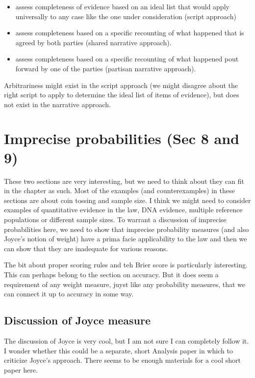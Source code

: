 \documentclass[
  10pt,
  dvipsnames,enabledeprecatedfontcommands]{scrartcl}
\begin{document}
\begin{itemize}
\item
  assess completeness of evidence based on an ideal list that would
  apply universally to any case like the one under consideration (script
  approach)
\item
  assess completeness based on a specific recounting of what happened
  that is agreed by both parties (shared narrative approach).
\item
  assess completeness based on a specific recounting of what happened
  pout forward by one of the parties (partisan narrative approach).
\end{itemize}

Arbitrariness might exist in the script approach (we might disagree
about the right script to apply to determine the ideal list of items of
evidence), but does not exist in the narrative approach.

\hypertarget{imprecise-probabilities-sec-8-and-9}{%
\section{Imprecise probabilities (Sec 8 and
9)}\label{imprecise-probabilities-sec-8-and-9}}

These two sections are very interesting, but we need to think about they
can fit in the chapter as such. Most of the examples (and
counterexamples) in these sections are about coin tossing and sample
size. I think we might need to consider examples of quantitative
evidence in the law, DNA evidence, multiple reference populations or
different sample sizes. To warrant a discussion of imprecise
probabilities here, we need to show that imprecise probability measures
(and also Joyce's notion of weight) have a prima facie applicability to
the law and then we can show that they are inadequate for various
reasons.

The bit about proper scoring rules and teh Brier score is particularly
interesting. This can perhaps belong to the section on accuracy. But it
does seem a requirement of any weight measure, juyst like any
probability measures, that we can connect it up to accuracy in some way.

\hypertarget{discussion-of-joyce-measure}{%
\subsection{Discussion of Joyce
measure}\label{discussion-of-joyce-measure}}

The discussion of Joyce is very cool, but I am not sure I can completely
follow it. I wonder whether this could be a separate, short Analysis
paper in which to criticize Joyce's approach. There seems to be enough
materials for a cool short paper here.
\end{document}
